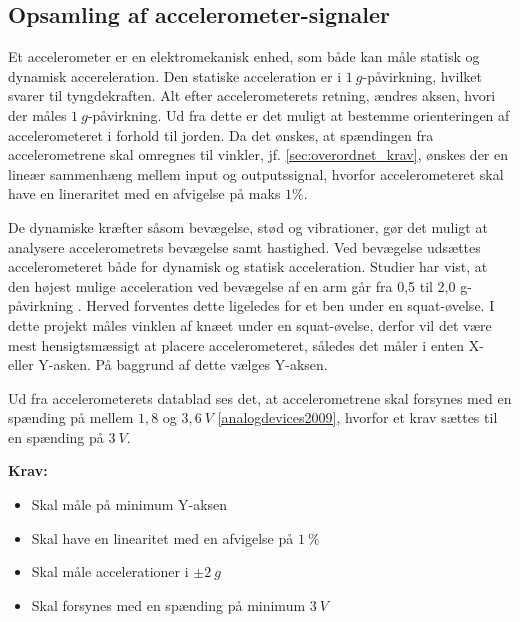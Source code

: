\subsection{Opsamling af accelerometer-signaler} \label{sec:acc_teori}
Et accelerometer er en elektromekanisk enhed, som både kan måle statisk og dynamisk accereleration. Den statiske acceleration er i $1~g$-påvirkning, hvilket svarer til tyngdekraften. Alt efter accelerometerets retning, ændres aksen, hvori der måles $1~g$-påvirkning. Ud fra dette er det muligt at bestemme orienteringen af accelerometeret i forhold til jorden. Da det ønskes, at spændingen fra accelerometrene skal omregnes til vinkler, jf. \autoref{sec:overordnet_krav}, ønskes der en lineær sammenhæng mellem input og outputssignal, hvorfor accelerometeret skal have en lineraritet med en afvigelse på maks $1\%$. 

De dynamiske kræfter såsom bevægelse, stød og vibrationer, gør det muligt at analysere accelerometrets bevægelse samt hastighed. Ved bevægelse udsættes accelerometeret både for dynamisk og statisk acceleration. Studier har vist, at den højest mulige acceleration ved bevægelse af en arm går fra 0,5 til 2,0 g-påvirkning \citep{bernmarka2002}. Herved forventes dette ligeledes for et ben under en squat-øvelse. I dette projekt måles vinklen af knæet under en squat-øvelse, derfor vil det være mest hensigtsmæssigt at placere accelerometeret, således det måler i enten X- eller Y-asken. På baggrund af dette vælges Y-aksen.

Ud fra accelerometerets datablad ses det, at accelerometrene skal forsynes med en spænding på mellem $1,8$ og $3,6~V$ \autoref{analogdevices2009}, hvorfor et krav sættes til en spænding på $3~V$.

\vspace{3mm}
\textbf{Krav:}
\begin{itemize}
\item Skal måle på minimum Y-aksen
\item Skal have en linearitet med en afvigelse på $1~\%$
\item Skal måle accelerationer i $\pm 2~g$
\item Skal forsynes med en spænding på minimum $3~V$
\end{itemize}